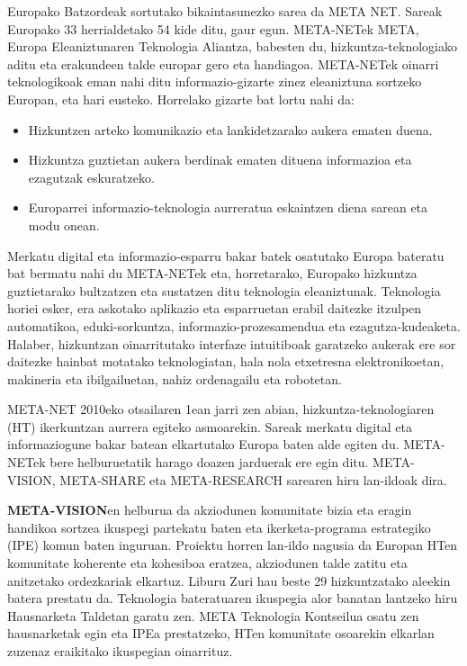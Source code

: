 \begin{multicols}{2}

Europako Batzordeak sortutako bikaintasunezko sarea da META NET. Sareak Europako 33 herrialdetako 54 kide ditu, gaur egun. META-NETek META, Europa Eleaniztunaren Teknologia Aliantza, babesten du, hizkuntza-teknologiako aditu eta erakundeen talde europar gero eta handiagoa. META-NETek oinarri teknologikoak eman nahi ditu informazio-gizarte zinez eleaniztuna sortzeko Europan, eta hari eusteko. Horrelako gizarte bat lortu nahi da:

\begin{itemize}
	\item Hizkuntzen arteko komunikazio eta lankidetzarako aukera ematen duena.
	\item 	Hizkuntza guztietan aukera berdinak ematen dituena informazioa eta ezagutzak eskuratzeko.
	\item Europarrei informazio-teknologia aurreratua eskaintzen diena sarean eta modu onean.
\end{itemize}

Merkatu digital eta informazio-esparru bakar batek osatutako Europa bateratu bat bermatu nahi du META-NETek eta, horretarako, Europako hizkuntza guztietarako bultzatzen eta sustatzen ditu teknologia eleaniztunak. Teknologia horiei esker, era askotako aplikazio eta esparruetan erabil daitezke itzulpen automatikoa, eduki-sorkuntza, informazio-prozesamendua eta ezagutza-kudeaketa. Halaber, hizkuntzan oinarritutako interfaze intuitiboak garatzeko aukerak ere sor daitezke hainbat motatako teknologiatan, hala nola etxetresna elektronikoetan, makineria eta ibilgailuetan, nahiz ordenagailu eta robotetan.


   META-NET 2010eko otsailaren 1ean jarri zen abian, hizkuntza-teknologiaren (HT) ikerkuntzan aurrera egiteko asmoarekin. Sareak merkatu digital eta informaziogune bakar batean elkartutako Europa baten alde egiten du. META-NETek bere helburuetatik harago doazen jarduerak ere egin ditu. META-VISION, META-SHARE eta META-RESEARCH sarearen hiru lan-ildoak dira.

\textbf{META-VISION}en helburua da akziodunen komunitate bizia eta eragin handikoa sortzea ikuspegi partekatu baten eta ikerketa-programa estrategiko (IPE) komun baten inguruan. Proiektu horren lan-ildo nagusia da Europan HTen komunitate koherente eta kohesiboa eratzea, akziodunen talde zatitu eta anitzetako ordezkariak elkartuz. Liburu Zuri hau beste 29 hizkuntzatako aleekin batera prestatu da. Teknologia bateratuaren ikuspegia alor banatan lantzeko hiru Hausnarketa Taldetan garatu zen. META Teknologia Kontseilua osatu zen hausnarketak egin eta IPEa prestatzeko, HTen komunitate osoarekin elkarlan zuzenaz eraikitako ikuspegian oinarrituz.


\end{multicols}
